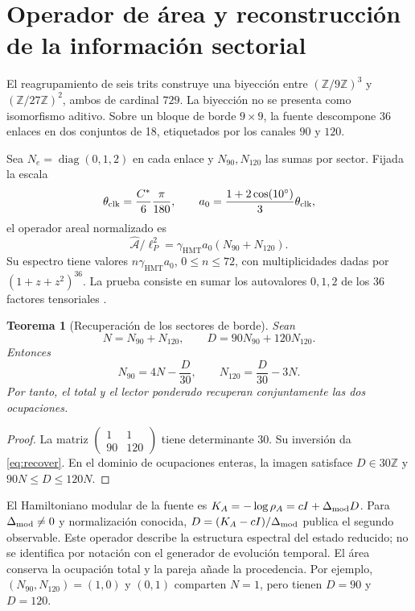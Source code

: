 \documentclass[11pt,a4paper]{article}
\numberwithin{equation}{section}
\newtheorem{theorem}{Teorema}[section]
\theoremstyle{definition}
\newcommand{\HMT}{\mathrm{HMT}}
\newcommand{\Z}{\mathbb Z}
\begin{document}
\section{Operador de área y reconstrucción de la información sectorial}
\label{sec:area}
El reagrupamiento de seis trits construye una biyección entre
$(\Z/9\Z)^3$ y $(\Z/27\Z)^2$, ambos de cardinal $729$.
La biyección no se presenta como isomorfismo aditivo. Sobre un bloque
de borde $9\times9$, la fuente descompone 36 enlaces en dos
conjuntos de 18, etiquetados por los canales $90$ y $120$.

Sea $N_e=\operatorname{diag}(0,1,2)$ en cada enlace y
$N_{90},N_{120}$ las sumas por sector. Fijada la escala
\[
\theta_{\rm clk}=\frac{C^*}{6}\frac{\pi}{180},\qquad
a_0=\frac{1+2\cos(10^\circ)}3\theta_{\rm clk},
\]
el operador areal normalizado es
\[
\widehat{\mathcal A}/\ell_P^2
=\gamma_{\HMT}a_0(N_{90}+N_{120}).
\]
Su espectro tiene valores $n\gamma_{\HMT}a_0$, $0\le n\le72$,
con multiplicidades dadas por $(1+z+z^2)^{36}$.
La prueba consiste en sumar los autovalores $0,1,2$ de los
36 factores tensoriales \cite{area}.

\begin{theorem}[Recuperación de los sectores de borde]
Sean
\[
N=N_{90}+N_{120},\qquad D=90N_{90}+120N_{120}.
\]
Entonces
\begin{equation}
N_{90}=4N-\frac D{30},\qquad
N_{120}=\frac D{30}-3N.
\label{eq:recover}
\end{equation}
Por tanto, el total y el lector ponderado recuperan conjuntamente
las dos ocupaciones.
\end{theorem}
\begin{proof}
La matriz $\left(\begin{smallmatrix}1&1\\90&120\end{smallmatrix}\right)$
tiene determinante $30$. Su inversión da \eqref{eq:recover}.
En el dominio de ocupaciones enteras, la imagen satisface
$D\in30\Z$ y $90N\le D\le120N$.
\end{proof}

El Hamiltoniano modular de la fuente es
$K_A=-\log\rho_A=cI+\Delta_{\rm mod}D$.
Para $\Delta_{\rm mod}\ne0$ y normalización conocida,
$D=(K_A-cI)/\Delta_{\rm mod}$ publica el segundo observable.
Este operador describe la estructura espectral del estado reducido;
no se identifica por notación con el generador de evolución temporal.
El área conserva la ocupación total y la pareja añade la procedencia.
Por ejemplo, $(N_{90},N_{120})=(1,0)$ y $(0,1)$ comparten $N=1$,
pero tienen $D=90$ y $D=120$.
\end{document}
